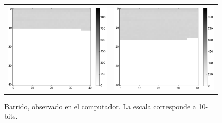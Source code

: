 \documentclass[10pt]{article}
\begin{document}
		\begin{figure}[h]
			\centering
			\begin{tabular}{cc}
				\includegraphics[width=0.3\linewidth]{data1.png} &
				\includegraphics[width=0.3\linewidth]{data2.png}
			\end{tabular}
			\caption{Barrido, observado en el computador. La escala corresponde a 10-bits.}
		\end{figure}
	
	\nocite{*}
	
	
\end{document}

